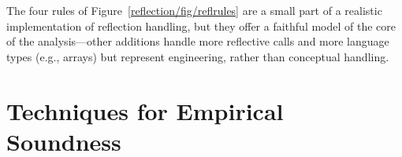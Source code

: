The four rules of Figure~\ref{reflection/fig/reflrules} are a small
part of a realistic implementation of reflection handling, but they
offer a faithful model of the core of the analysis---other additions
handle more reflective calls and more language types (e.g., arrays)
but represent engineering, rather than conceptual handling.


%
%
%
%



\section{Techniques for Empirical Soundness}
\label{reflection/soundiness}

